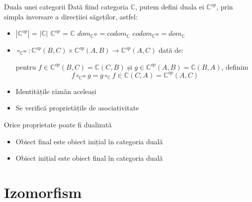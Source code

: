 \documentclass[xcolor=pdftex,romanian,colorlinks]{beamer}
\begin{document}
\begin{frame}{Duala unei categorii}
Dată fiind categoria $\mathbb{C}$, putem defini duala ei $\mathbb{C}^{op}$, prin simpla inversare a direcțiiei săgeților, astfel:
\begin{itemize}
\item $|\mathbb{C}^{op}|$ = $|\mathbb{C}|$
\hfill $\mathbb{C}^{op}$ = $\mathbb{C}$
\hfill $\mathit{dom}_{\mathbb{C}^{op}} = \mathit{codom}_{\mathbb{C}}$
\hfill $\mathit{codom}_{\mathbb{C}^{op}} = \mathit{dom}_{\mathbb{C}}$
\item $\circ_{\mathbb{C}^{op}} : \mathbb{C}^{op}(B,C) \times \mathbb{C}^{op}(A,B) \rightarrow \mathbb{C}^{op}(A,C)$ dată de:

pentru $f\in \mathbb{C}^{op}(B,C) = \mathbb{C}(C,B)$ și  $g\in \mathbb{C}^{op}(A,B) = \mathbb{C}(B,A)$, definim 
$$f \circ_{\mathbb{C}^{op}} g = g \circ_{\mathbb{C}} f \in  \mathbb{C}(C,A) = \mathbb{C}^{op}(A,C)$$
\item Identitățile rămân aceleași
\item Se verifică proprietățile de asociativitate
\end{itemize}

\begin{block}{Orice proprietate poate fi dualizată}
\begin{itemize}
\item Obiect final este obiect inițial în categoria duală
\item Obiect inițial este obiect final în categoria duală
\end{itemize}
\end{block}
\end{frame}

\section{Izomorfism}
\end{document}
